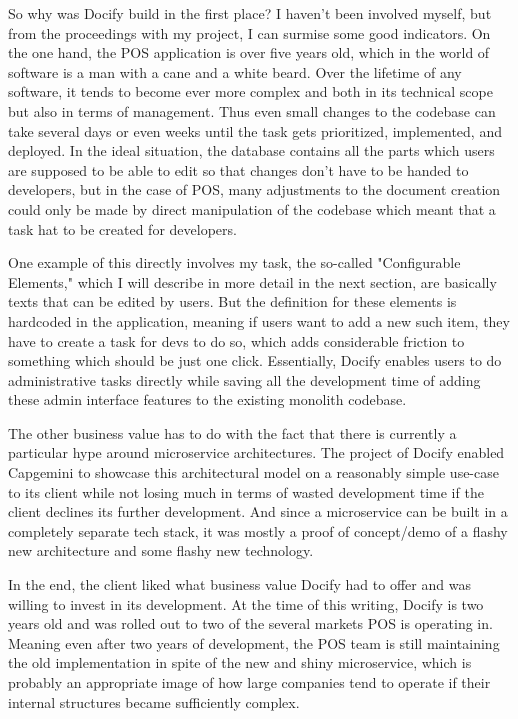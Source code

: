 So why was Docify build in the first place? I haven't been involved myself, but from the proceedings with my project, I can surmise some good indicators. On the one hand, the POS application is over five years old, which in the world of software is a man with a cane and a white beard. Over the lifetime of any software, it tends to become ever more complex and both in its technical scope but also in terms of management. Thus even small changes to the codebase can take several days or even weeks until the task gets prioritized, implemented, and deployed. In the ideal situation, the database contains all the parts which users are supposed to be able to edit so that changes don't have to be handed to developers, but in the case of POS, many adjustments to the document creation could only be made by direct manipulation of the codebase which meant that a task hat to be created for developers.

One example of this directly involves my task, the so-called "Configurable Elements," which I will describe in more detail in the next section, are basically texts that can be edited by users. But the definition for these elements is hardcoded in the application, meaning if users want to add a new such item, they have to create a task for devs to do so, which adds considerable friction to something which should be just one click. Essentially, Docify enables users to do administrative tasks directly while saving all the development time of adding these admin interface features to the existing monolith codebase.

The other business value has to do with the fact that there is currently a particular hype around microservice architectures. The project of Docify enabled Capgemini to showcase this architectural model on a reasonably simple use-case to its client while not losing much in terms of wasted development time if the client declines its further development. And since a microservice can be built in a completely separate tech stack, it was mostly a proof of concept/demo of a flashy new architecture and some flashy new technology.

In the end, the client liked what business value Docify had to offer and was willing to invest in its development. At the time of this writing, Docify is two years old and was rolled out to two of the several markets POS is operating in. Meaning even after two years of development, the POS team is still maintaining the old implementation in spite of the new and shiny microservice, which is probably an appropriate image of how large companies tend to operate if their internal structures became sufficiently complex.


